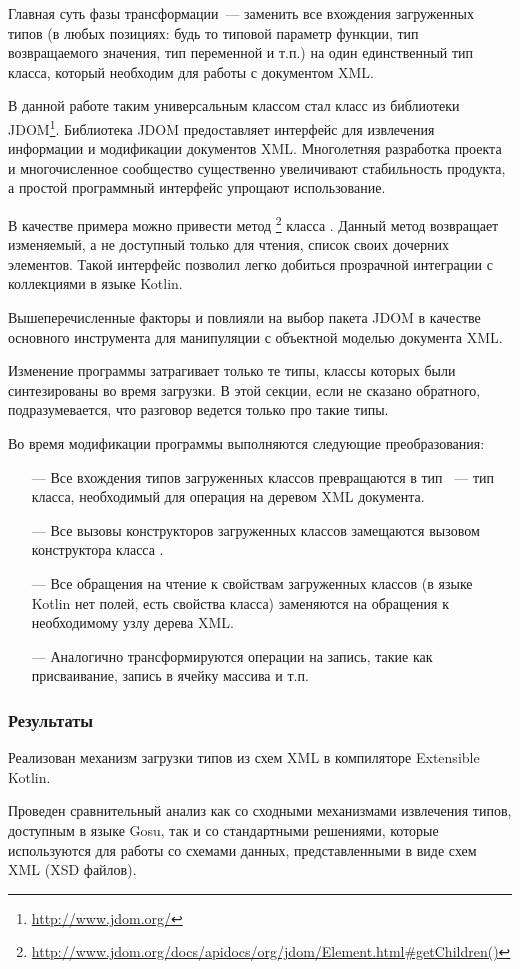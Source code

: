 Главная суть фазы трансформации~--- заменить все вхождения загруженных типов (в любых позициях: будь то типовой параметр функции, тип возвращаемого значения, тип переменной и т.п.) на один единственный тип класса, который необходим для работы с документом XML.

В данной работе таким универсальным классом стал класс  из библиотеки JDOM\footnote{\url{http://www.jdom.org/}}. Библиотека JDOM предоставляет интерфейс для извлечения информации и модификации документов XML. Многолетняя разработка проекта и многочисленное сообщество существенно увеличивают стабильность продукта, а простой программный интерфейс упрощают использование.

В качестве примера можно привести метод \footnote{\url{http://www.jdom.org/docs/apidocs/org/jdom/Element.html\#getChildren()}} класса .
Данный метод возвращает изменяемый, а не доступный только для чтения, список своих дочерних элементов. Такой интерфейс позволил легко добиться прозрачной интеграции с коллекциями в языке Kotlin.

Вышеперечисленные факторы и повлияли на выбор пакета JDOM в качестве основного инструмента для манипуляции с объектной моделью документа XML.

Изменение программы затрагивает только те типы, классы которых были синтезированы во время загрузки. В этой секции, если не сказано обратного, подразумевается, что разговор ведется только про такие типы.

Во время модификации программы выполняются следующие преобразования:
\begin{itemize}
\item[---] Все вхождения типов загруженных классов превращаются в тип ~--- тип класса, необходимый для операция на деревом XML документа.
\item[---] Все вызовы конструкторов загруженных классов замещаются вызовом конструктора класса .
\item[---] Все обращения на чтение к свойствам загруженных классов (в языке Kotlin нет полей, есть свойства класса) заменяются на обращения к необходимому узлу дерева XML.
\item[---] Аналогично трансформируются операции на запись, такие как присваивание, запись в ячейку массива и т.п.
\end{itemize}

\subsubsection{Результаты}
Реализован механизм загрузки типов из схем XML в компиляторе Extensible Kotlin.

Проведен сравнительный анализ как со сходными механизмами извлечения типов, доступным в языке Gosu, так и со стандартными решениями, которые используются для работы со схемами данных, представленными в виде схем XML (XSD файлов).